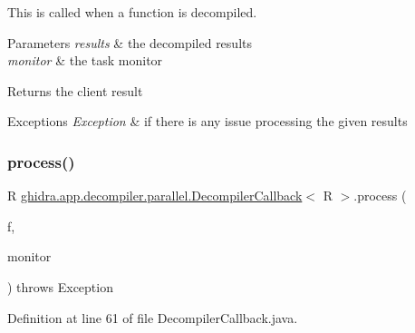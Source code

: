 This is called when a function is decompiled.


\begin{DoxyParams}{Parameters}
{\em results} & the decompiled results \\
\hline
{\em monitor} & the task monitor \\
\hline
\end{DoxyParams}
\begin{DoxyReturn}{Returns}
the client result 
\end{DoxyReturn}

\begin{DoxyExceptions}{Exceptions}
{\em Exception} & if there is any issue processing the given results \\
\hline
\end{DoxyExceptions}
\mbox{\label{classghidra_1_1app_1_1decompiler_1_1parallel_1_1_decompiler_callback_ae6c111f0e5eb83fadce287f6203868d6}} 
\subsubsection{\texorpdfstring{process()}{process()}\hspace{0.1cm}{\footnotesize\ttfamily [2/2]}}
{\footnotesize\ttfamily R \mbox{\hyperlink{classghidra_1_1app_1_1decompiler_1_1parallel_1_1_decompiler_callback}{ghidra.\+app.\+decompiler.\+parallel.\+Decompiler\+Callback}}$<$ R $>$.process (\begin{DoxyParamCaption}\item[{Function}]{f,  }\item[{Task\+Monitor}]{monitor }\end{DoxyParamCaption}) throws Exception\hspace{0.3cm}{\ttfamily [inline]}}



Definition at line 61 of file Decompiler\+Callback.\+java.

\mbox{\label{classghidra_1_1app_1_1decompiler_1_1parallel_1_1_decompiler_callback_adec6e5b5a210ecaf2bcb28e1c42415f1}} 
